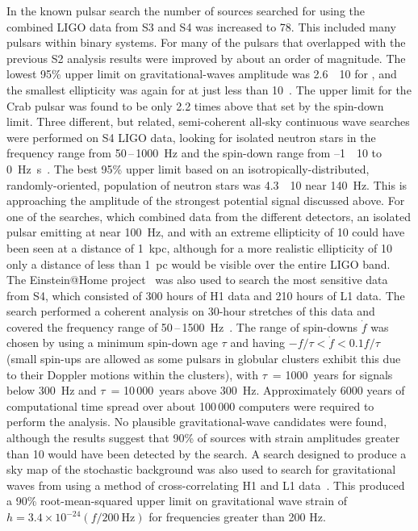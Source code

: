 In the known pulsar search the number of sources searched for using the combined LIGO data from S3 and S4 was 
increased to 78. This included many pulsars within binary systems. For many of the pulsars that overlapped 
with the previous S2 analysis results were improved by about an order of magnitude. The lowest 95\%
upper limit on gravitational-waves amplitude was 2.6~\texttimes~10 for
, and the smallest ellipticity was again for  at 
just less than 10~\cite{Abbott:2007d}. The upper limit for the Crab pulsar was found to be only 2.2 
times above that set by the spin-down limit. Three different, but related, semi-coherent all-sky continuous 
wave searches were performed on S4 LIGO data, looking for isolated neutron stars in the frequency
range from 50\,--\,1000~Hz and the spin-down range from --1~\texttimes~10 to 
0~Hz~s~\cite{Abbott:2008e}. The best 95\% upper limit based on an isotropically-distributed, 
randomly-oriented, population of neutron stars was 4.3~\texttimes~10 near 140~Hz. This is 
approaching the amplitude of the strongest potential signal discussed above. For one of the searches, which
combined data from the different detectors, an isolated pulsar emitting at near 100~Hz, and with an extreme 
ellipticity of 10 could have been seen at a distance of 1~kpc, although for a more realistic 
ellipticity of 10 only a distance of less than 1~pc would be visible over the entire LIGO band. The
Einstein@Home project~\cite{eath} was also used to search the most sensitive data from S4, which consisted of 
300 hours of H1 data and 210 hours of L1 data. The search performed a coherent analysis on 30-hour stretches 
of this data and covered the frequency range of 50\,--\,1500~Hz~\cite{Abbott:2008f}. The range of spin-downs 
$\dot{f}$ was chosen by using a minimum spin-down age $\tau$ and having $-f/\tau < \dot{f} < 0.1f/\tau$ 
(small spin-ups are allowed as some pulsars in globular clusters exhibit this due to their Doppler motions 
within the clusters), with $\tau$~= 1000~years for signals below 300~Hz and $\tau$~= 10\,000~years above 
300~Hz. Approximately 6000 years of computational time spread over about 100\,000 computers were required to 
perform the analysis. No plausible gravitational-wave candidates were found, although the results suggest
that 90\% of sources with strain amplitudes greater than 10 would have been detected by the 
search. A search designed to produce a sky map of the stochastic background was also used to search for 
gravitational waves from  using a method of cross-correlating H1 and L1 
data~\cite{Abbott:2007f}. This produced a 90\% root-mean-squared upper limit on gravitational wave strain
of $h = 3.4\times10^{-24}(f/200 \mathrm{\ Hz})$ for frequencies greater than 200 Hz.


